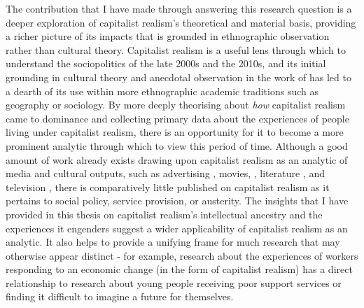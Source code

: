 The contribution that I have made through answering this research question is a deeper exploration of capitalist realism's theoretical and material basis, providing a richer picture of its impacts that is grounded in ethnographic observation rather than cultural theory. Capitalist realism is a useful lens through which to understand the sociopolitics of the late 2000s and the 2010s, and its initial grounding in cultural theory and anecdotal observation in the work of \citet{fisher_capitalist_2009} has led to a dearth of its use within more ethnographic academic traditions such as geography or sociology. By more deeply theorising about \textit{how} capitalist realism came to dominance and collecting primary data about the experiences of people living under capitalist realism, there is an opportunity for it to become a more prominent analytic through which to view this period of time. Although a good amount of work already exists drawing upon capitalist realism as an analytic of media and cultural outputs, such as advertising \citep{schudson_advertising_2013}, movies, \citep{flisfeder_love_2017}, literature \cite{jr_for_2022}, and television \citep{la_berge_capitalist_2010}, there is comparatively little published on capitalist realism as it pertains to social policy, service provision, or austerity. The insights that I have provided in this thesis on  capitalist realism's intellectual ancestry and the experiences it engenders suggest a wider applicability of capitalist realism as an analytic. It also helps to provide a unifying frame for much research that may otherwise appear distinct - for example, research about the experiences of workers responding to an economic change (in the form of capitalist realism) has a direct relationship to research about young people receiving poor support services or finding it difficult to imagine a future for themselves.  

